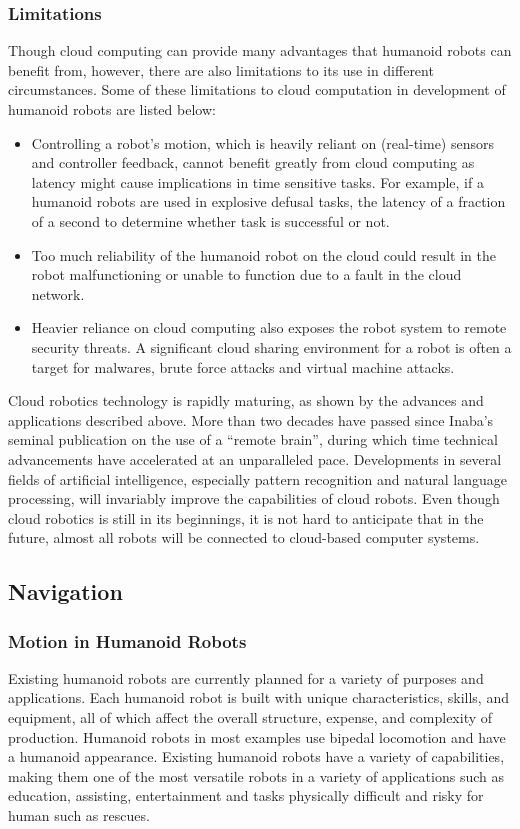 \documentclass[conference]{IEEEtran}
\begin{document}
\subsubsection{Limitations}
Though cloud computing can provide many advantages that humanoid robots can benefit from, however, there are also limitations to its use in different circumstances. Some of these limitations to cloud computation in development of humanoid robots are listed below:
\begin{itemize}
\item{} Controlling a robot's motion, which is heavily reliant on (real-time) sensors and controller feedback, cannot benefit greatly from cloud computing as latency might cause implications in time sensitive tasks. For example, if a humanoid robots are used in explosive defusal tasks, the latency of a fraction of a second to determine whether task is successful or not.
\item{} Too much reliability of the humanoid robot on the cloud could result in the robot malfunctioning or unable to function due to a fault in the cloud network.
\item{} Heavier reliance on cloud computing also exposes the robot system to remote security threats. A significant cloud sharing environment for a robot is often a target for malwares, brute force attacks and virtual machine attacks.
\end{itemize}
Cloud robotics technology is rapidly maturing, as shown by the advances and applications described above. More than two decades have passed since Inaba's seminal publication on the use of a “remote brain”, during which time technical advancements have accelerated at an unparalleled pace. Developments in several fields of artificial intelligence, especially pattern recognition and natural language processing, will invariably improve the capabilities of cloud robots. Even though cloud robotics is still in its beginnings, it is not hard to anticipate that in the future, almost all robots will be connected to cloud-based computer systems.
\subsection{Navigation}
\subsubsection{Motion in Humanoid Robots}
Existing humanoid robots are currently planned for a variety of purposes and applications. Each humanoid robot is built with unique characteristics, skills, and equipment, all of which affect the overall structure, expense, and complexity of production. Humanoid robots in most examples use bipedal locomotion and have a humanoid appearance. Existing humanoid robots have a variety of capabilities, making them one of the most versatile robots in a variety of applications such as education, assisting, entertainment and tasks physically difficult and risky for human such as rescues.
\end{document}
